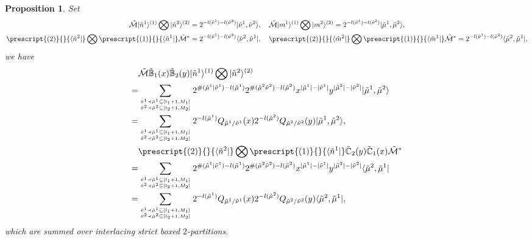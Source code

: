 \documentclass[11pt,reqno]{amsart}
\numberwithin{equation}{section}
\newtheorem{proposition}[theorem]{Proposition}
\begin{document}
	
	\begin{proposition}
		Set 
		\begin{align}\label{M-map}
			\tilde{\mathcal{M}}  | \tilde{n}^{1}\rangle^{(1)}\bigotimes|\tilde{n}^{2}\rangle^{(2)}&=
			2^{-l(\tilde{\nu}^{1})-l(\tilde{\nu}^{2})}	| \tilde{\nu}^{1},\tilde{\nu}^{2} \rangle ,
			\quad 	\tilde{\mathcal{M}}  | m^{1}\rangle^{(1)}\bigotimes|m^{2}\rangle^{(2)}=
			2^{-l(\tilde{\nu}^{1})-l(\tilde{\nu}^{2})}
			| \tilde{\mu}^{1},\tilde{\mu}^{2} \rangle,
			\\
			\prescript{(2)}{}{\langle \tilde{n}^{2}|}\bigotimes \prescript{(1)}{}{\langle \tilde{n}^{1}|}  \tilde{\mathcal{M}}^* &= 2^{-l(\tilde{\nu}^{1})-l(\tilde{\nu}^{2})}
			\langle \tilde{\nu}^{2},\tilde{\nu}^{1}|, \quad
			\prescript{(2)}{}{\langle \tilde{m}^{2}|}\bigotimes \prescript{(1)}{}{\langle \tilde{m}^{1}|}  \tilde{\mathcal{M}}^* = 2^{-l(\tilde{\nu}^{1})-l(\tilde{\nu}^{2})}
			\langle \tilde{\mu}^{2},\tilde{\mu}^{1}| ,
		\end{align}
		we have
		\begin{align}
			&\tilde{\mathcal{M}} \tilde{\mathbb{B}}_{1}(x)\tilde{\mathbb{B}}_{2}(y)|\tilde{n}^{1}\rangle^{(1)}\bigotimes|\tilde{n}^{2}\rangle^{(2)} \notag\\
			=& \sum_{{ \tilde{\nu}^{1} \prec \tilde{\mu}^{1} \subseteq [l_{1}+1,M_{1}] }\atop{\tilde{\nu}^{2} \prec \tilde{\mu}^{2} \subseteq [l_{2}+1,M_{2}]}}
			2^{\#(\tilde{\mu}^{1}|\tilde{\nu}^{1}) - l(\tilde{\mu}^{1})}
			2^{\#(\tilde{\mu}^{2}\tilde{\nu}^{2}) - l(\tilde{\mu}^{2})}
			x^{|\tilde{\mu}^{1}| - |\tilde{\nu}^{1}|} y^{|\tilde{\mu}^{2}| - |\tilde{\nu}^{2}|}
			| \tilde{\mu}^{1},\tilde{\mu}^{2} \rangle	\notag\\
			= &\sum_{{ \tilde{\nu}^{1} \prec \tilde{\mu}^{1} \subseteq [l_{1}+1,M_{1}] }\atop{\tilde{\nu}^{2} \prec \tilde{\mu}^{2} \subseteq [l_{2}+1,M_{2}]}}
			2^{- l(\tilde{\mu}^{1})}	Q_{\tilde{\mu}^{1}/\tilde{\nu}^{1}}(x) 2^{- l(\tilde{\mu}^{2})}Q_{\tilde{\mu}^{2}/\tilde{\nu}^{2}}(y)
			| \tilde{\mu}^{1},\tilde{\mu}^{2} \rangle,	\label{M-B1-B2-N}
			\\
			&\prescript{(2)}{}{\langle \tilde{n}^{2}|}\bigotimes \prescript{(1)}{}{\langle \tilde{n}^{1}|}
			\tilde{\mathbb{C}}_{2}(y)\tilde{\mathbb{C}}_{1}(x)
			\tilde{\mathcal{M}}^* \notag\\
			=&
			\sum_{{ \tilde{\nu}^{1} \prec \tilde{\mu}^{1} \subseteq [l_{1}+1,M_{1}] }\atop{\tilde{\nu}^{2} \prec \tilde{\mu}^{2} \subseteq [l_{2}+1,M_{2}]}}
			2^{\#(\tilde{\mu}^{1}|\tilde{\nu}^{1}) - l(\tilde{\mu}^{1})}
			2^{\#(\tilde{\mu}^{2}\tilde{\nu}^{2}) - l(\tilde{\mu}^{2})}
			x^{|\tilde{\mu}^{1}| - |\tilde{\nu}^{1}|} y^{|\tilde{\mu}^{2}| - |\tilde{\nu}^{2}|}
			\langle \tilde{\mu}^{2},\tilde{\mu}^{1} |\notag\\
			=&	\sum_{{ \tilde{\nu}^{1} \prec \tilde{\mu}^{1} \subseteq [l_{1}+1,M_{1}] }\atop{\tilde{\nu}^{2} \prec \tilde{\mu}^{2} \subseteq [l_{2}+1,M_{2}]}}
			2^{- l(\tilde{\mu}^{1})}	Q_{\tilde{\mu}^{1}/\tilde{\nu}^{1}}(x) 2^{- l(\tilde{\mu}^{2})}Q_{\tilde{\mu}^{2}/\tilde{\nu}^{2}}(y)
			\langle \tilde{\mu}^{2},\tilde{\mu}^{1} |,\label{M-C1-C2-N}
		\end{align}	
		which are summed over interlacing  strict boxed   $2$-partitions.
	\end{proposition}
\end{document}
